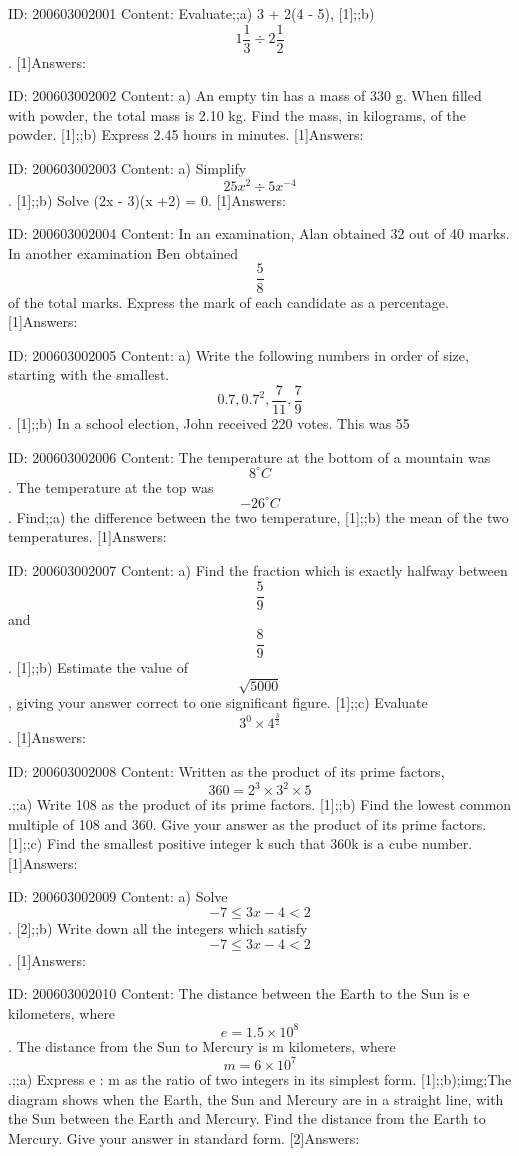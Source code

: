 \documentclass{article}
\begin{document}
ID: 200603002001
Content:
Evaluate;;a) 3 + 2(4 - 5), [1];;b) $$1\frac{1}{3} \div 2\frac{1}{2}$$. [1]Answers:

ID: 200603002002
Content:
a) An empty tin has a mass of 330 g. When filled with powder, the total mass is 2.10 kg. Find the mass, in kilograms, of the powder. [1];;b) Express 2.45 hours in minutes. [1]Answers:

ID: 200603002003
Content:
a) Simplify $$25x^{2} \div 5x^{-4}$$. [1];;b) Solve (2x - 3)(x +2) = 0. [1]Answers:

ID: 200603002004
Content:
In an examination, Alan obtained 32 out of 40 marks. In another examination Ben obtained $$\frac{5}{8}$$ of the total marks. Express the mark of each candidate as a percentage. [1]Answers:

ID: 200603002005
Content:
a) Write the following numbers in order of size, starting with the smallest. $$0.7, 0.7^{2} , \frac{7}{11}, \frac{7}{9}$$. [1];;b) In a school election, John received 220 votes. This was 55%

ID: 200603002006
Content:
The temperature at the bottom of a mountain was $$8^{\circ}C$$. The temperature at the top was $$-26^{\circ}C$$. Find;;a) the difference between the two temperature, [1];;b) the mean of the two temperatures. [1]Answers:

ID: 200603002007
Content:
a) Find the fraction which is exactly halfway between $$\frac{5}{9}$$ and $$\frac{8}{9}$$. [1];;b) Estimate the value of $$\sqrt{5000}$$, giving your answer correct to one significant figure. [1];;c) Evaluate $$3^{0} \times 4^{\frac{3}{2}}$$. [1]Answers:

ID: 200603002008
Content:
Written as the product of its prime factors, $$360=2^{3} \times 3^{2} \times 5$$.;;a) Write 108 as the product of its prime factors. [1];;b) Find the lowest common multiple of 108 and 360. Give your answer as the product of its prime factors. [1];;c) Find the smallest positive integer k such that 360k is a cube number. [1]Answers:

ID: 200603002009
Content:
a) Solve $$-7\leq 3x-4<2$$. [2];;b) Write down all the integers which satisfy $$-7\leq 3x-4<2$$. [1]Answers:

ID: 200603002010
Content:
The distance between the Earth to the Sun is e kilometers, where $$e=1.5 \times  10^8$$. The distance from the Sun to Mercury is m kilometers, where $$m=6 \times 10^{7} $$.;;a) Express e : m as the ratio of two integers in its simplest form. [1];;b);img;The diagram shows when the Earth, the Sun and Mercury are in a straight line, with the Sun between the Earth and Mercury. Find the distance from the Earth to Mercury. Give your answer in standard form. [2]Answers:
\end{document}
